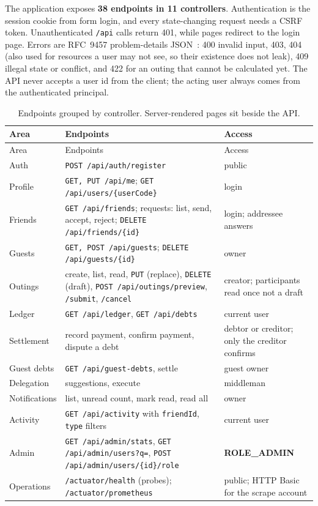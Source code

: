 \documentclass[10pt,a4paper]{article}
\newcommand{\code}[1]{\texttt{#1}}
\begin{document}
The application exposes \textbf{38 endpoints in 11 controllers}. Authentication is the session cookie from form login,
and every state-changing request needs a CSRF token. Unauthenticated \code{/api} calls return 401, while pages redirect
to the login page. Errors are RFC~9457 problem-details JSON~\cite{rfc9457}: 400 invalid input, 403, 404 (also used for
resources a user may not see, so their existence does not leak), 409 illegal state or conflict, and 422 for an outing
that cannot be calculated yet. The API never accepts a user id from the client; the acting user always comes from the
authenticated principal.

{\small
\begin{longtable}{@{}>{\raggedright\arraybackslash}p{2.1cm}>{\raggedright\arraybackslash}p{6.7cm}>{\raggedright\arraybackslash}p{6.5cm}@{}}
\caption{Endpoints grouped by controller. Server-rendered pages sit beside the API.}\\
\toprule
Area & Endpoints & Access \\
\midrule
\endfirsthead
\toprule
Area & Endpoints & Access \\
\midrule
\endhead
\bottomrule
\endfoot
Auth & \code{POST /api/auth/register} & public \\
Profile & \code{GET, PUT /api/me}; \code{GET /api/users/\{userCode\}} & login \\
Friends & \code{GET /api/friends}; requests: list, send, accept, reject; \code{DELETE /api/friends/\{id\}} & login; addressee answers \\
Guests & \code{GET, POST /api/guests}; \code{DELETE /api/guests/\{id\}} & owner \\
Outings & create, list, read, \code{PUT} (replace), \code{DELETE} (draft), \code{POST /api/outings/preview}, \code{/submit}, \code{/cancel} & creator; participants read once not a draft \\
Ledger & \code{GET /api/ledger}, \code{GET /api/debts} & current user \\
Settlement & record payment, confirm payment, dispute a debt & debtor or creditor; only the creditor confirms \\
Guest debts & \code{GET /api/guest-debts}, settle & guest owner \\
Delegation & suggestions, execute & middleman \\
Notifications & list, unread count, mark read, read all & owner \\
Activity & \code{GET /api/activity} with \code{friendId}, \code{type} filters & current user \\
Admin & \code{GET /api/admin/stats}, \code{GET /api/admin/users?q=}, \code{POST /api/admin/users/\{id\}/role} & \textbf{ROLE\_ADMIN} \\
Operations & \code{/actuator/health} (probes); \code{/actuator/prometheus} & public; HTTP Basic for the scrape account \\
\end{longtable}}
\end{document}
